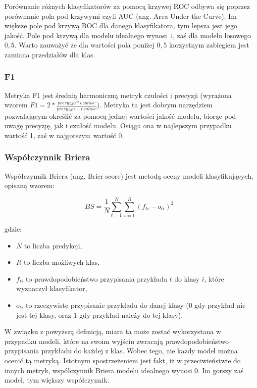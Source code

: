 \documentclass[a4paper, twoside, 11pt, openright]{article}
\begin{document}
Porównanie różnych klasyfikatorów za pomocą krzywej ROC odbywa się poprzez porównanie pola pod krzywymi czyli AUC (ang. Area Under the Curve). Im większe pole pod krzywą ROC dla danego klasyfikatora, tym lepsza jest jego jakość. Pole pod krzywą dla modelu idealnego wynosi $1$, zaś dla modelu losowego $0,5$. Warto zauważyć że dla wartości pola poniżej $0,5$ korzystnym zabiegiem jest zamiana przedziałów dla klas.

\subsubsection{F1}

Metryka F1 jest średnią harmoniczną metryk czułości i precyzji (wyrażona wzorem $F1=2*\frac{precyzja*czulosc}{precyzja+czulosc}$). Metryka ta jest dobrym narzędziem pozwalającym określić za pomocą jednej wartości jakość modelu, biorąc pod uwagę precyzję, jak i czułość modelu. Osiąga ona w najlepszym przypadku wartość 1, zaś w najgorszym wartość 0. 

\subsubsection{Współczynnik Briera}

Współczynnik Briera (ang. Brier score)\cite{brier} jest metodą oceny modeli klasyfikujących, opisaną wzorem:

\begin{equation}
BS=\frac{1}{N} \sum_{t=1}^{N} \sum_{i=1}^{R}(f_{ti}-o_{ti})^2
\end{equation}

gdzie:
\begin{itemize}
\item $N$ to liczba predykcji,
\item $R$  to liczba możliwych klas,
\item $f_{ti}$ to prawdopodobieństwo przypisania przykładu $t$ do klasy $i$, które wyznaczył klasyfikator,
\item $o_{ti}$ to rzeczywiste przypisanie przykładu do danej klasy (0 gdy przykład nie jest tej klasy, oraz 1 gdy przykład należy do tej klasy).
\end{itemize}

W związku z powyższą definicją, miara ta może zostać wykorzystana w przypadku modeli, które na swoim wyjściu zwracają prawdopodobieństwo przypisania przykładu do każdej z klas. Wobec tego, nie każdy model można ocenić tą metryką. Istotnym spostrzeżeniem jest fakt, iż w przeciwieństwie do innych metryk, współczynnik Briera modelu idealnego wynosi $0$. Im gorszy zaś model, tym większy współczynnik.
\end{document}
